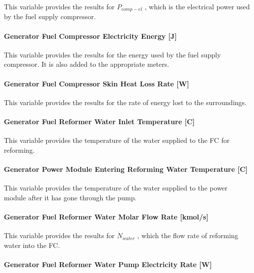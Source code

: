This variable provides the results for \({P_{comp - el}}\) , which is the electrical power used by the fuel supply compressor.

\paragraph{Generator Fuel Compressor Electricity Energy {[}J{]}}\label{generator-fuel-compressor-electric-energy-j}

This variable provides the results for the energy used by the fuel supply compressor. It is also added to the appropriate meters.

\paragraph{Generator Fuel Compressor Skin Heat Loss Rate {[}W{]}}\label{generator-fuel-compressor-skin-heat-loss-rate-w}

This variable provides the results for the rate of energy lost to the surroundings.

\paragraph{Generator Fuel Reformer Water Inlet Temperature {[}C{]}}\label{generator-fuel-reformer-water-inlet-temperature-c}

This variable provides the temperature of the water supplied to the FC for reforming.

\paragraph{Generator Power Module Entering Reforming Water Temperature {[}C{]}}\label{generator-power-module-entering-reforming-water-temperature-c}

This variable provides the temperature of the water supplied to the power module after it has gone through the pump.

\paragraph{Generator Fuel Reformer Water Molar Flow Rate {[}kmol/s{]}}\label{generator-fuel-reformer-water-molar-flow-rate-kmols}

This variable provides the results for \({\dot N_{water}}\) , which the flow rate of reforming water into the FC.

\paragraph{Generator Fuel Reformer Water Pump Electricity Rate {[}W{]}}\label{generator-fuel-reformer-water-pump-electric-power-w}

